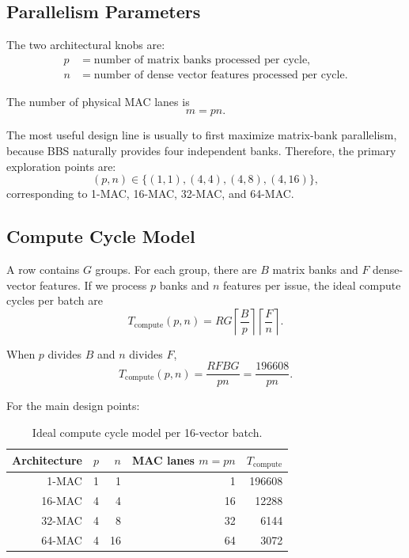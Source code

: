 \documentclass[11pt,a4paper]{article}
\begin{document}
\subsection{Parallelism Parameters}

The two architectural knobs are:
\begin{align*}
    p &= \text{number of matrix banks processed per cycle},\\
    n &= \text{number of dense vector features processed per cycle}.
\end{align*}

The number of physical MAC lanes is
\begin{equation}
    m = p n.
\end{equation}

The most useful design line is usually to first maximize matrix-bank parallelism, because BBS naturally provides four independent banks. Therefore, the primary exploration points are:
\begin{equation}
    (p,n) \in \{(1,1), (4,4), (4,8), (4,16)\},
\end{equation}
corresponding to 1-MAC, 16-MAC, 32-MAC, and 64-MAC.

\subsection{Compute Cycle Model}

A row contains $G$ groups. For each group, there are $B$ matrix banks and $F$ dense-vector features. If we process $p$ banks and $n$ features per issue, the ideal compute cycles per batch are
\begin{equation}
    T_{\mathrm{compute}}(p,n)
    = R G \left\lceil \frac{B}{p} \right\rceil
          \left\lceil \frac{F}{n} \right\rceil.
\end{equation}

When $p$ divides $B$ and $n$ divides $F$,
\begin{equation}
    T_{\mathrm{compute}}(p,n)
    = \frac{R F B G}{pn}
    = \frac{196608}{pn}.
\end{equation}

For the main design points:
\begin{table}[H]
\centering
\caption{Ideal compute cycle model per 16-vector batch.}
\begin{tabular}{rrrrr}
\toprule
Architecture & $p$ & $n$ & MAC lanes $m=pn$ & $T_{\mathrm{compute}}$ \\
\midrule
1-MAC & 1 & 1 & 1 & 196608 \\
16-MAC & 4 & 4 & 16 & 12288 \\
32-MAC & 4 & 8 & 32 & 6144 \\
64-MAC & 4 & 16 & 64 & 3072 \\
\bottomrule
\end{tabular}
\end{table}
\end{document}
